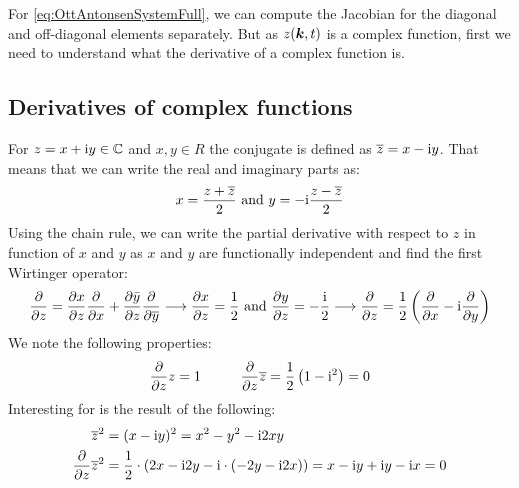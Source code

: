 For \eqref{eq:OttAntonsenSystemFull}, we can compute the Jacobian for the diagonal and off-diagonal elements separately. But as $z({\boldsymbol{k}},t)$ is a complex function, first we need to understand what the derivative of a complex function is. 


\subsection{Derivatives of complex functions}
For $z = x + {\rm{i}} y \in {\mathbb{C}}$ and $x,y \in R$ the conjugate is defined as $\overline{z} = x - {\rm{i}} y$. That means that we can write the real and imaginary parts as:
\begin{align*}
x = \frac{z + \overline{z}}{2} \text{  and   }   y = -{\rm{i}} \frac{z - \overline{z}}{2}
\end{align*}
Using the chain rule, we can write the partial derivative with respect to $z$ in function of $x$ and $y$ as $x$ and $y$ are functionally independent and find the first Wirtinger operator:
\begin{align*}
\frac{\partial}{\partial z} =\frac{\partial x}{\partial z} \frac{\partial}{\partial x}+\frac{\partial \bar{y}}{\partial z} \frac{\partial}{\partial \overline{y}} 
\longrightarrow \frac{\partial x}{\partial z} = \frac{1}{2} \text{   and   } \frac{\partial y}{\partial z} =  - \frac{{\rm{i}}}{2} 
\longrightarrow \frac{\partial}{\partial z} = \frac{1}{2}\left(\frac{\partial}{\partial x} - {\rm{i}} \frac{\partial}{\partial y}\right)
\end{align*}
We note the following properties:
\begin{align*}
\frac{\partial}{\partial z} z = 1 \hspace{10mm} \frac{\partial}{\partial z}\overline{z} = \frac{1}{2}\left(1 - \ic^2 \right) = 0
\end{align*}
Interesting for is the result of the following: 
\begin{align*}
\overline{z}^2 &= (x - {\rm{i}} y)^2 = x^2 - y^2 - {\rm{i}} 2xy \\
\frac{\partial}{\partial z} \overline{z}^2 &=  \frac{1}{2}\cdot(2x -{\rm{i}} 2y - {\rm{i}}\cdot(-2y -{\rm{i}} 2x)) = x -{\rm{i}} y + {\rm{i}} y -{\rm{i}} x = 0
\end{align*}



